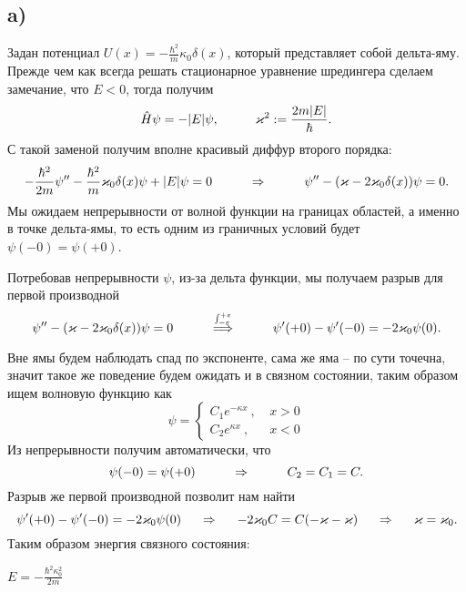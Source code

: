 \subsection*{a)}
Задан потенциал $U(x) = - \frac{\hbar^2}{m}\kappa_0 \delta(x)$, который представляет собой дельта-яму. Прежде чем как всегда решать стационарное уравнение шредингера сделаем замечание, что $E < 0$, тогда получим
\begin{equation*}
	\hat{H} \psi = - |E| \psi,
	\hspace{1 cm}
	\kappa^2 := \frac{2 m |E|}{\hbar}.
\end{equation*}
С такой заменой получим вполне красивый диффур второго порядка:
\begin{equation*}
	-\frac{\hbar^2}{2m} \psi'' - \frac{\hbar^2}{m}\kappa_0 \delta(x) \psi + |E|\psi = 0
	\hspace{1 cm}
	\Rightarrow
	\hspace{1 cm}
	\psi'' - (\kappa - 2 \kappa_0 \delta(x))\psi=0.
\end{equation*}
Мы ожидаем непрерывности от волной функции на границах областей, а именно в точке дельта-ямы, то есть одним из граничных условий будет $\psi(-0) = \psi(+0)$.

Потребовав непрерывности $\psi$, из-за дельта функции,  мы получаем разрыв для первой производной
\begin{equation*}
	\psi'' - (\kappa - 2 \kappa_0 \delta(x))\psi=0
	\hspace{1 cm}
	\overset{\int_{-\varepsilon}^{+\varepsilon} }{\Longrightarrow}
	\hspace{1 cm}
	\psi'(+0) - \psi'(-0) = - 2 \kappa_0 \psi(0).
\end{equation*}

Вне ямы будем наблюдать спад по экспоненте, сама же яма -- по сути точечна, значит такое же поведение будем ожидать и в связном состоянии, таким образом ищем волновую функцию как
\begin{equation*}
	\psi = \left\{\begin{aligned}
		C_1 e^{-\kappa x} \ , \ & x>0\\
		C_2 e^{\kappa x} \ , \ & x<0
	\end{aligned}\right.
\end{equation*}
Из непрерывности получим автоматически, что
\begin{equation*}
	\psi(-0) = \psi(+0)
	\hspace{1 cm}
	\Rightarrow
	\hspace{1 cm}
	C_2 = C_1 = C.
\end{equation*}
Разрыв же первой производной позволит нам найти
\begin{equation*}
	\psi'(+0) - \psi'(-0) = - 2 \kappa_0 \psi(0)
	\hspace{0.5 cm}
	\Rightarrow
	\hspace{0.5 cm}
	- 2 \kappa_0 C = C (-\kappa - \kappa)
	\hspace{0.5 cm}
	\Rightarrow
	\hspace{0.5 cm}
	\kappa = \kappa_0.
\end{equation*}
Таким образом  энергия связного состояния:
\begin{flushright}
	$\boxed{E = - \frac{\hbar^2 \kappa_0^2}{2 m}}$
\end{flushright}

